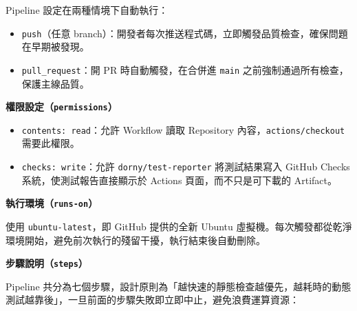 \documentclass[11pt,a4paper]{article}
\begin{document}
Pipeline 設定在兩種情境下自動執行：
\begin{itemize}
    \item \texttt{push}（任意 branch）：開發者每次推送程式碼，立即觸發品質檢查，確保問題在早期被發現。
    \item \texttt{pull\_request}：開 PR 時自動觸發，在合併進 \texttt{main} 之前強制通過所有檢查，保護主線品質。
\end{itemize}

\textbf{權限設定（\texttt{permissions}）}

\begin{itemize}
    \item \texttt{contents: read}：允許 Workflow 讀取 Repository 內容，\texttt{actions/checkout} 需要此權限。
    \item \texttt{checks: write}：允許 \texttt{dorny/test-reporter} 將測試結果寫入 GitHub Checks 系統，使測試報告直接顯示於 Actions 頁面，而不只是可下載的 Artifact。
\end{itemize}

\textbf{執行環境（\texttt{runs-on}）}

使用 \texttt{ubuntu-latest}，即 GitHub 提供的全新 Ubuntu 虛擬機。每次觸發都從乾淨環境開始，避免前次執行的殘留干擾，執行結束後自動刪除。

\textbf{步驟說明（\texttt{steps}）}

Pipeline 共分為七個步驟，設計原則為「越快速的靜態檢查越優先，越耗時的動態測試越靠後」，一旦前面的步驟失敗即立即中止，避免浪費運算資源：
\end{document}
